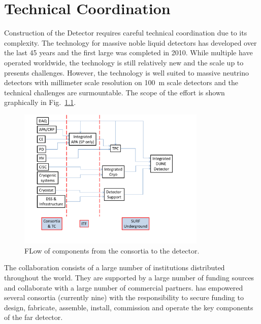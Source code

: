 \chapter{Technical Coordination}
\label{ch:fdsp-coord}

Construction of the  Detector requires careful technical
coordination due to its complexity. The technology for massive noble
liquid detectors has developed over the last \num{45} years and the first
large  was completed in
2010. While multiple  have operated worldwide, the technology
is still relatively new and the scale up to  presents
challenges. However, the technology is well suited to massive neutrino
detectors with millimeter scale resolution on \SI{100}{m} scale detectors and
the technical challenges are surmountable. The scope of the effort is shown graphically in Fig.~\ref{fig:TC_flow}.
\begin{figure}[htb]
  \begin{center}
    \includegraphics[width=0.8\textwidth]{far-detector-generic/figures/DUNE_deliverable_flow}
    \caption{FLow of components from the consortia to the detector.}
    \label{fig:TC_flow}
  \end{center}
\end{figure}



The  collaboration consists of a large number of
institutions distributed throughout the world. They are supported by a
large number of funding sources and collaborate with a large number of
commercial partners.  has empowered several consortia
(currently nine) with the responsibility to secure funding to design,
fabricate, assemble, install, commission and operate the key
components of the  far detector.

